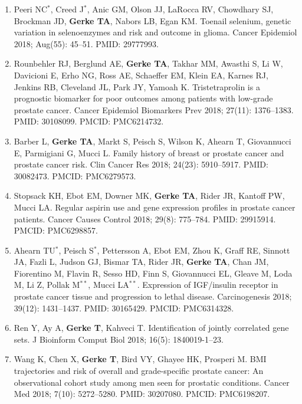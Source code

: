 \documentclass[11pt, a4paper]{article} %
\begin{document}
\begin{enumerate}[leftmargin=*]
\item{} Peeri NC$^*$, Creed J$^*$, Anic GM, Olson JJ, LaRocca RV, Chowdhary SJ, Brockman JD, {\bf Gerke TA}, Nabors LB, Egan KM. Toenail selenium, genetic variation in selenoenzymes and risk and outcome in glioma. Cancer Epidemiol 2018; Aug(55): 45--51. PMID: 29777993.

\item{} Rounbehler RJ, Berglund AE, {\bf Gerke TA}, Takhar MM, Awasthi S, Li W, Davicioni E, Erho NG, Ross AE, Schaeffer EM, Klein EA, Karnes RJ, Jenkins RB, Cleveland JL, Park JY, Yamoah K. Tristetraprolin is a prognostic biomarker for poor outcomes among patients with low-grade prostate cancer. Cancer Epidemiol Biomarkers Prev 2018; 27(11): 1376--1383. PMID: 30108099. PMCID: PMC6214732.

\item{} Barber L, {\bf Gerke TA}, Markt S, Peisch S, Wilson K, Ahearn T, Giovannucci E, Parmigiani G, Mucci L. Family history of breast or prostate cancer and prostate cancer risk. Clin Cancer Res 2018; 24(23): 5910--5917. PMID: 30082473. PMCID: PMC6279573.

\item{} Stopsack KH, Ebot EM, Downer MK, {\bf Gerke TA}, Rider JR, Kantoff PW, Mucci LA. Regular aspirin use and gene expression profiles in prostate cancer patients. Cancer Causes Control 2018; 29(8): 775--784. PMID: 29915914. PMCID: PMC6298857.

\item{} Ahearn TU$^*$, Peisch S$^*$, Pettersson A, Ebot EM, Zhou K, Graff RE, Sinnott JA, Fazli L, Judson GJ, Bismar TA, Rider JR, {\bf Gerke TA}, Chan JM, Fiorentino M, Flavin R, Sesso HD, Finn S, Giovannucci EL, Gleave M, Loda M, Li Z, Pollak M$^{**}$, Mucci LA$^{**}$. Expression of IGF/insulin receptor in prostate cancer tissue and progression to lethal disease. Carcinogenesis 2018; 39(12): 1431--1437. PMID: 30165429. PMCID: PMC6314328.

\item{} Ren Y, Ay A, {\bf Gerke T}, Kahveci T. Identification of jointly correlated gene sets. J Bioinform Comput Biol 2018; 16(5): 1840019-1--23.

\item{} Wang K, Chen X, {\bf Gerke T}, Bird VY, Ghayee HK, Prosperi M. BMI trajectories and risk of overall and grade-specific prostate cancer: An observational cohort study among men seen for prostatic conditions. Cancer Med 2018; 7(10): 5272--5280. PMID: 30207080. PMCID: PMC6198207. 


\end{enumerate}
\end{document}
